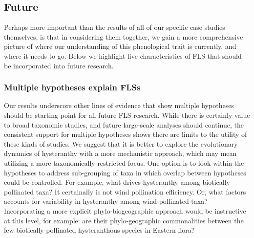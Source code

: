 \documentclass[12pt]{article}\usepackage[]{graphicx}\usepackage[]{color}
\begin{document}
\subsection*{Future}
\indent\indent Perhaps more important than the results of all of our specific case studies themselves, is that in considering them together, we gain a more comprehensive picture of where our understanding of this phenological trait is currently, and where it needs to go. Below we highlight five characteristics of FLS that should be incorporated into future research.
\subsubsection*{Multiple hypotheses explain FLSs}
\indent\indent Our results underscore other lines of evidence that show multiple hypotheses should be starting point for all future FLS research. While there is certainly value to broad taxonomic studies, and future large-scale analyses should continue, the consistent support for multiple hypotheses shows there are limits to the utility of these kinds of studies. We suggest that it is better to explore the evolutionary dynamics of hysteranthy with a more mechanistic approach, which may mean utilizing a more taxonomically-restricted focus. One option is to look within the hypotheses to address sub-grouping of taxa in which overlap between hypotheses could be controlled. For example, what drives hysteranthy among biotically-pollinated taxa? It certainally is not wind pollination efficiency. Or, what factors accounts for variability in hysteranthy among wind-pollinated taxa? Incorporating a more explicit phylo-biogeographic approach would be instructive at this level, for example: are their phylo-geographic commonalities between the few biotically-pollinated hysteranthous species in Eastern flora?\\%
\end{document}

